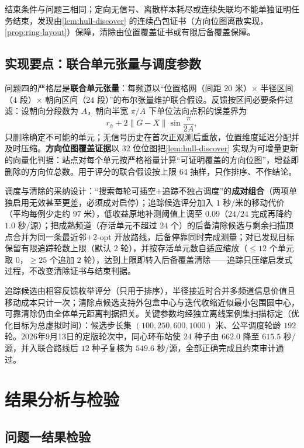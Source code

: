 \documentclass[withoutpreface]{cumcmthesis}
\begin{document}
结束条件与问题三相同；定向无信号、离散样本耗尽或连续失联均不能单独证明任务结束，发现由\cref{lem:hull-discover} 的连续凸包证书（方向位图离散实现，\cref{prop:ring-layout}）保障，清除由位置覆盖证书或有限后备覆盖保障。

\subsection{实现要点：联合单元张量与调度参数}

问题四的严格层是\textbf{联合单元张量}：每频道以“位置格网（间距 $20$ 米）$\times$ 半径区间（$4$ 段）$\times$ 朝向区间（$24$ 段）”的布尔张量维护联合假设。反馈按区间必要条件过滤：设朝向分段数为 $A$，朝向半宽 $\pi/A$ 下单位法向点积的误差界为
\[
r_h+2\|G-X\|\sin\frac{\pi}{2A},
\]
只删除确定不可能的单元；无信号历史在首次正观测后重放，位置维度延迟分配并及时压缩。\textbf{方向位图覆盖证据}以 $32$ 位位图把\cref{lem:hull-discover} 实现为可增量更新的向量化判据：站点对每个单元按严格裕量计算“可证明覆盖的方向位图”，增益即删除的方向位总数。用于评分的联合假设按上限 $64$ 抽样，只作排序、不作结论。

调度与清除的采纳设计：“搜索每轮可插空$+$追踪不独占调度”的\textbf{成对组合}（两项单独启用无效甚至更差，必须成对启停）；追踪候选评分加入 $1$ 秒/米的移动代价（平均每例少走约 $97$ 米），低收益原地补测阈值上调至 $0.09$（$24/24$ 完成再降约 $1.0$ 秒/源）；把成熟频道（存活单元不超过 $24$ 个）的后备清除候选与剩余扫描顶点合并为同一条最近邻$+$2-opt 开放路线，后备停靠同时完成测量；对已发现目标保留有限追踪轮数上限（默认 $2$ 轮），并按存活单元数自适应缩放（$\le12$ 个单元取 $0$，$\ge25$ 个追加 $2$ 轮），达到上限即转入后备覆盖清除——追踪只压缩启发式过程，不改变清除证书与结束判据。

追踪候选由相容反馈枚举评分（只用于排序），半径接近时合并多频道信息价值且移动成本只计一次；清除点候选支持外包盒中心与迭代收缩近似最小包围圆中心，可靠清除仍由全体单元距离判据把关。关键参数均经独立离线案例集扫描标定（优化目标为总虚拟时间）：候选步长集 $(100,250,600,1000)$ 米、公平调度轮龄 $192$ 轮。2026年9月13日的定版轮次中，同心环布站使 $24$ 种子由 $662.0$ 降至 $615.5$ 秒/源，并入联合路线后 $12$ 种子复核为 $549.6$ 秒/源，全部正确完成且约束审计通过。

\section{结果分析与检验}

\subsection{问题一结果检验}
\end{document}
